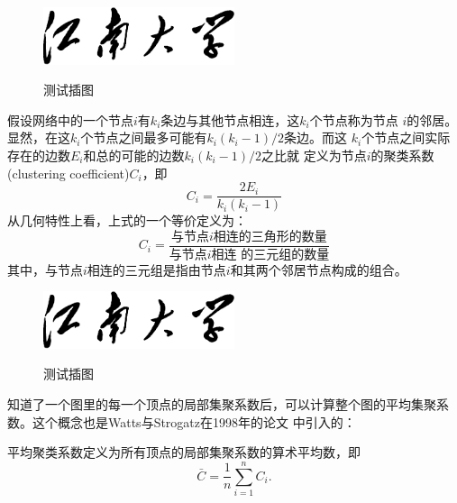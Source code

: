 \documentclass[bachelor,winfonts]{jnuthesis}
\begin{document}
    \begin{definition}[局部聚类系数]
        
        
        \begin{figure}[htbp]
            \centering
            \includegraphics[width= 0.5\textwidth]{jnuname}\\
            \caption{测试插图}\label{fig:test5}
        \end{figure}
        
        假设网络中的一个节点$i$有$k_i$条边与其他节点相连，这$k_i$个节点称为节点
        $i$的邻居。显然，在这$k_i$个节点之间最多可能有$k_i(k_i-1)/2$条边。而这
        $k_i$个节点之间实际存在的边数$E_i$和总的可能的边数$k_i(k_i-1)/2$之比就
        定义为节点$i$的聚类系数(clustering coefficient)$C_i$，即
        \begin{equation}\label{eq:clustering_coefficient}
        C_i = \frac{2E_i}{k_i(k_i-1)}
        \end{equation}
        从几何特性上看，上式的一个等价定义为：
        \begin{equation}\label{eq:clustering_coefficient_triangle}
        C_i = \frac{\text{与节点$i$相连的三角形的数量}}{\text{与节点$i$相连
                的三元组的数量}}
        \end{equation}
        其中，与节点$i$相连的三元组是指由节点$i$和其两个邻居节点构成的组合。
    \end{definition}
    
    \begin{figure}[htbp]
        \centering
        \includegraphics[width= 0.5\textwidth]{jnuname}\\
        \caption{测试插图}\label{fig:test6}
    \end{figure}
    
    知道了一个图里的每一个顶点的局部集聚系数后，可以计算整个图的平均集聚系
    数。这个概念也是Watts与Strogatz在1998年的论文
    \cite{watts1998smallworld}中引入的：
    
    \begin{definition}[平均聚类系数]
        平均聚类系数定义为所有顶点的局部集聚系数的算术平均数，即
        \begin{equation}
        \bar{C} = \frac{1}{n}\sum_{i=1}^{n} C_i.
        \end{equation}
    \end{definition}
    
\end{document}
